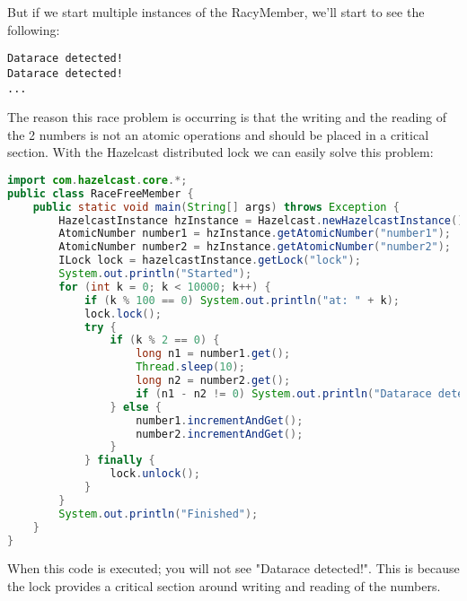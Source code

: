 But if we start multiple instances of the RacyMember, we'll start to see the following:
\begin{lstlisting}
Datarace detected!
Datarace detected!
...
\end{lstlisting}
The reason this race problem is occurring is that the writing and the reading of the 2 numbers is not an atomic operations and should be placed in a critical section. With the Hazelcast distributed lock we can easily solve this problem:
\begin{lstlisting}[language=java]
import com.hazelcast.core.*;
public class RaceFreeMember {
    public static void main(String[] args) throws Exception {
        HazelcastInstance hzInstance = Hazelcast.newHazelcastInstance();
        AtomicNumber number1 = hzInstance.getAtomicNumber("number1");
        AtomicNumber number2 = hzInstance.getAtomicNumber("number2");
        ILock lock = hazelcastInstance.getLock("lock");
        System.out.println("Started");
        for (int k = 0; k < 10000; k++) {
            if (k % 100 == 0) System.out.println("at: " + k);
            lock.lock();
            try {
                if (k % 2 == 0) {
                    long n1 = number1.get();
                    Thread.sleep(10);
                    long n2 = number2.get();
                    if (n1 - n2 != 0) System.out.println("Datarace detected!");
                } else {
                    number1.incrementAndGet();
                    number2.incrementAndGet();
                }
            } finally {
                lock.unlock();
            }
        }
        System.out.println("Finished");
    }
}
\end{lstlisting}
When this code is executed; you will not see "Datarace detected!". This is because the lock provides a critical section around writing and reading of the numbers. 


